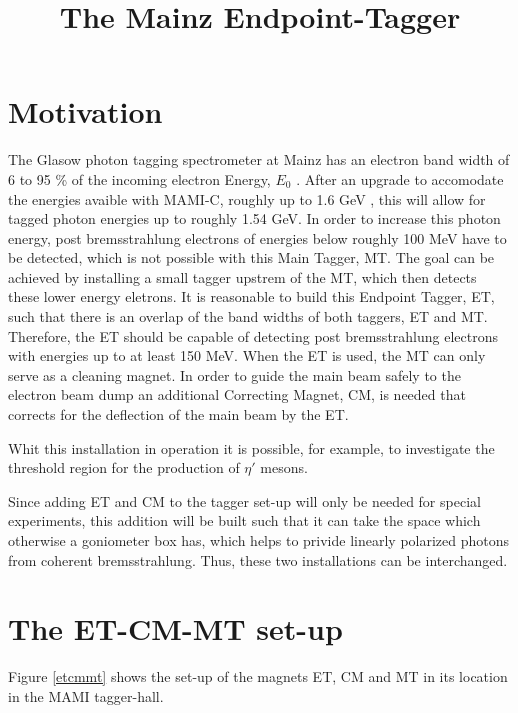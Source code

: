 
\title {The Mainz Endpoint-Tagger}

\section{Motivation}

The Glasow photon tagging spectrometer at Mainz has
an electron band width of 6 to 95 \% of the incoming electron
Energy, $E_0$ \cite{glatag}. After an upgrade \cite{taggup} to accomodate the
energies avaible with MAMI-C, roughly up to 1.6 GeV \cite{mamic}, this will
allow for tagged photon energies up to roughly 1.54 GeV. In order to
increase this photon energy, post bremsstrahlung electrons of energies
below roughly 100 MeV have to be detected, which is not possible with this
Main Tagger, MT. The goal can be achieved by installing a small tagger
upstrem of the MT, which then detects these lower energy eletrons. It is
reasonable to build this Endpoint Tagger, ET, such that there is an overlap
of the band widths of both taggers, ET and MT. Therefore, the ET should be
capable of detecting post bremsstrahlung electrons with energies up to
at least 150 MeV. When the ET is used, the MT
can only serve as a cleaning magnet. In order to guide the main beam safely to
the electron beam dump an additional Correcting Magnet, CM, is needed that
corrects for the deflection of the main beam by the ET.

Whit this installation in operation it is possible, for example,
to investigate the threshold region for the production of $\eta'$ mesons.

Since adding ET and CM to the tagger set-up will only be needed for special
experiments, this addition will be built such that it can take the space
which otherwise a goniometer box has, which helps to privide linearly
polarized photons from coherent bremsstrahlung. Thus, these two installations
can be interchanged.


\section{The ET-CM-MT set-up}

Figure \ref{etcmmt} shows the set-up of the magnets ET, CM and MT
in its location in the MAMI tagger-hall.\\

